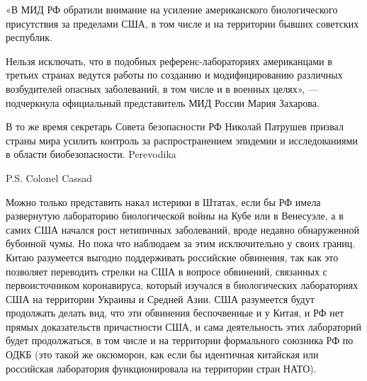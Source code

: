 «В МИД РФ обратили внимание на усиление американского биологического
присутствия за пределами США, в том числе и на территории бывших советских
республик.

Нельзя исключать, что в подобных референс-лабораториях американцами в третьих
странах ведутся работы по созданию и модифицированию различных возбудителей
опасных заболеваний, в том числе и в военных целях», --- подчеркнула официальный
представитель МИД России Мария Захарова.

В то же время секретарь Совета безопасности РФ Николай Патрушев призвал страны
мира усилить контроль за распространением эпидемии и исследованиями в области
биобезопасности.  Perevodika

P.S. Colonel Cassad

Можно только представить накал истерики в Штатах, если бы РФ имела развернутую
лабораторию биологической войны на Кубе или в Венесуэле, а в самих США начался
рост нетипичных заболеваний, вроде недавно обнаруженной бубонной чумы. Но пока
что наблюдаем за этим исключительно у своих границ.  Китаю разумеется выгодно
поддерживать российские обвинения, так как это позволяет переводить стрелки на
США в вопросе обвинений, связанных с первоисточником коронавируса, который
изучался в биологических лабораториях США на территории Украины и Средней Азии.
США разумеется будут продолжать делать вид, что эти обвинения беспочвенные и у
Китая, и РФ нет прямых доказательств причастности США, и сама деятельность этих
лабораторий будет продолжаться, в том числе и на территории формального
союзника РФ по ОДКБ (это такой же оксюморон, как если бы идентичная китайская
или российская лаборатория функционировала на территории стран НАТО).
  
